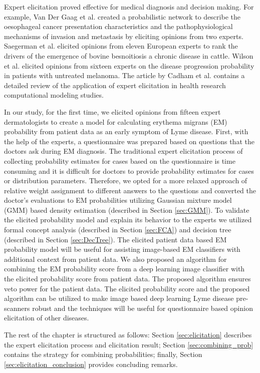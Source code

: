 Expert elicitation proved effective for medical diagnosis and decision making. For example, Van Der Gaag et al. \cite{VanDerGaag2002} created a probabilistic network to describe the oesophageal cancer presentation characteristics and the pathophysiological mechanisms of invasion and metastasis by eliciting opinions from two experts. Saegerman et al. \cite{Saegerman2022} elicited opinions from eleven European experts to rank the drivers of the emergence of bovine besnoitiosis a chronic disease in cattle.  Wilson et al. \cite{Wilson2018} elicited opinions from sixteen experts on the disease progression probability in patients with untreated melanoma. The article by Cadham et al. \cite{cadham2022use} contains a detailed review of the application of expert elicitation in health research computational modeling studies.

In our study, for the first time, we elicited opinions from fifteen expert dermatologists to create a model for calculating erythema migrans (EM) probability from patient data as an early symptom of Lyme disease. First, with the help of the experts, a questionnaire was prepared based on questions that the doctors ask during EM diagnosis. The traditional expert elicitation process of collecting probability estimates for cases based on the questionnaire is time consuming and it is difficult for doctors to provide probability estimates for cases or distribution parameters. Therefore, we opted for a more relaxed approach of relative weight assignment to different answers to the questions and converted the doctor’s evaluations to EM probabilities utilizing Gaussian mixture model (GMM) based density estimation (described in Section \ref{sec:GMM}). To validate the elicited probability model and explain its behavior to the experts we utilized formal concept analysis (described in Section \ref{sec:FCA}) and decision tree (described in Section \ref{sec:DecTree}). The elicited patient data based EM probability model will be useful for assisting image-based EM classifiers with additional context from patient data. We also proposed an algorithm for combining the EM probability score from a deep learning image classifier with the elicited probability score from patient data. The proposed algorithm ensures veto power for the patient data. The elicited probability score and the proposed algorithm can be utilized to make image based deep learning Lyme disease pre-scanners robust and the techniques will be useful for questionnaire based opinion elicitation of other diseases.

The rest of the chapter is structured as follows: Section \ref{sec:elicitation} describes the expert elicitation process and elicitation result; Section \ref{sec:combining_prob} contains the strategy for combining probabilities; finally, Section \ref{sec:elicitation_conclusion} provides concluding remarks.

